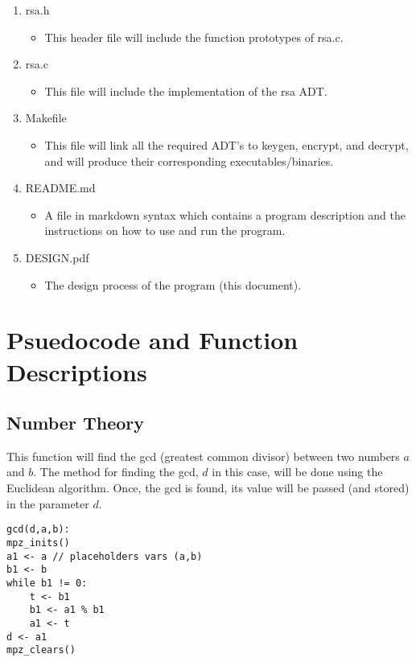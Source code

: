 \documentclass[
	12pt, %
]{fphw}
\begin{document}
\begin{enumerate}
	\item rsa.h
	\begin{itemize}
		\item This header file will include the function prototypes of rsa.c.
	\end{itemize}
		
	\item rsa.c
	\begin{itemize}
		\item This file will include the implementation of the rsa ADT.
	\end{itemize}
		
	\item Makefile
	\begin{itemize}
		\item This file will link all the required ADT's to keygen, encrypt, and decrypt, and will produce their corresponding executables/binaries.
	\end{itemize}
		
	\item README.md
	\begin{itemize}
		\item A file in markdown syntax which contains a program description and the instructions on how to use and run the program.
	\end{itemize}
	
	\item DESIGN.pdf
	\begin{itemize}
		\item The design process of the program (this document).
	\end{itemize}
	
\end{enumerate}


\section{Psuedocode and Function Descriptions}

\subsection{Number Theory}
This function will find the gcd (greatest common divisor) between two numbers $a$ and $b$. The method for finding the gcd, $d$ in this case, will be done using the Euclidean algorithm. Once, the gcd is found, its value will be passed (and stored) in the parameter $d$.
\begin{lstlisting}[mathescape=true]
gcd(d,a,b):
mpz_inits()
a1 <- a // placeholders vars (a,b)
b1 <- b
while b1 != 0:
	t <- b1
	b1 <- a1 % b1
	a1 <- t
d <- a1
mpz_clears()
\end{lstlisting}
\end{document}
